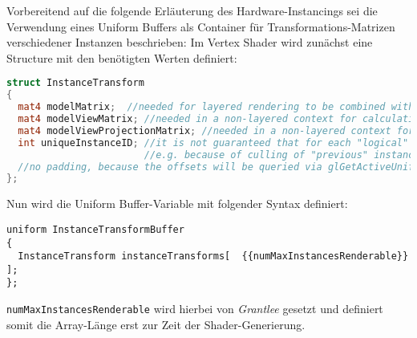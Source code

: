 	Vorbereitend auf die folgende Erläuterung des Hardware-Instancings sei die Verwendung eines Uniform Buffers
	als Container für Transformations-Matrizen verschiedener Instanzen beschrieben:
	Im Vertex Shader wird zunächst eine Structure mit den benötigten Werten definiert:
	
	\begin{lstlisting}[language=GLSL]
struct InstanceTransform
{
  mat4 modelMatrix;  //needed for layered rendering to be combined with the several lightsource matrices
  mat4 modelViewMatrix; //needed in a non-layered context for calculation of view-space values for lighting calculations
  mat4 modelViewProjectionMatrix; //needed in a non-layered context for gl_Position calculation
  int uniqueInstanceID; //it is not guaranteed that for each "logical" instance, the gl_InstanceID stays the same for every draw call
                        //e.g. because of culling of "previous" instances, the own gl_InstanceID will get smaller   
  //no padding, because the offsets will be queried via glGetActiveUniformsiv(...)
};
	\end{lstlisting}
	
	Nun wird die Uniform Buffer-Variable mit folgender Syntax definiert:
	
	\begin{lstlisting}
uniform InstanceTransformBuffer
{
  InstanceTransform instanceTransforms[  {{numMaxInstancesRenderable}} ];
};
	\end{lstlisting}
	
	\lstinline|numMaxInstancesRenderable| wird hierbei von \emph{Grantlee} gesetzt und definiert somit die Array-Länge
	erst zur Zeit der Shader-Generierung.
	

